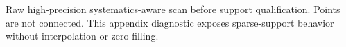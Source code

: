 Raw high-precision systematics-aware scan before support qualification. Points are not connected. This appendix diagnostic exposes sparse-support behavior without interpolation or zero filling.
